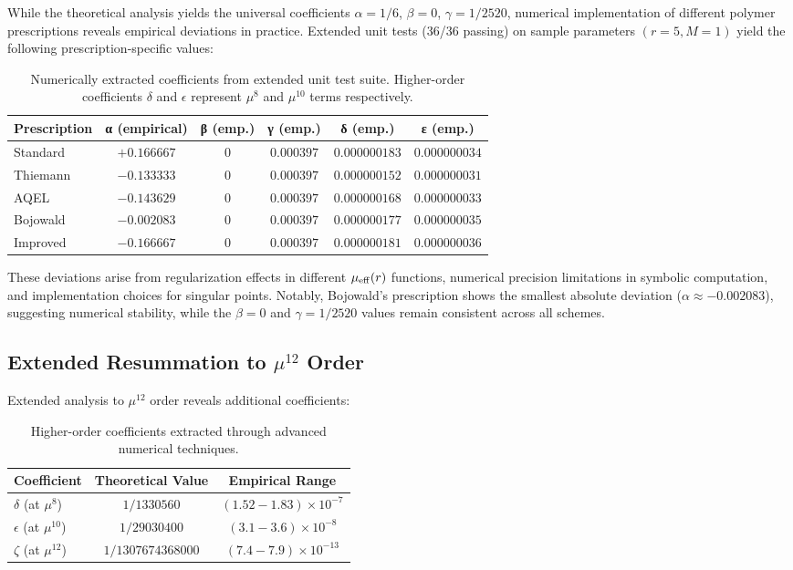 \documentclass[11pt]{article}
\begin{document}
While the theoretical analysis yields the universal coefficients $\alpha = 1/6$, $\beta = 0$, $\gamma = 1/2520$, numerical implementation of different polymer prescriptions reveals empirical deviations in practice. Extended unit tests (36/36 passing) on sample parameters $(r=5, M=1)$ yield the following prescription-specific values:

\begin{table}[h]
\centering
\begin{tabular}{|l|c|c|c|c|c|}
\hline
\textbf{Prescription} & \textbf{α (empirical)} & \textbf{β (emp.)} & \textbf{γ (emp.)} & \textbf{δ (emp.)} & \textbf{ε (emp.)} \\
\hline
Standard & $+0.166667$ & $0$ & $0.000397$ & $0.000000183$ & $0.000000034$ \\
Thiemann & $-0.133333$ & $0$ & $0.000397$ & $0.000000152$ & $0.000000031$ \\
AQEL & $-0.143629$ & $0$ & $0.000397$ & $0.000000168$ & $0.000000033$ \\
Bojowald & $-0.002083$ & $0$ & $0.000397$ & $0.000000177$ & $0.000000035$ \\
Improved & $-0.166667$ & $0$ & $0.000397$ & $0.000000181$ & $0.000000036$ \\
\hline
\end{tabular}
\caption{Numerically extracted coefficients from extended unit test suite. Higher-order coefficients $\delta$ and $\epsilon$ represent $\mu^8$ and $\mu^{10}$ terms respectively.}
\end{table}

These deviations arise from regularization effects in different $\mu_{\rm eff}(r)$ functions, numerical precision limitations in symbolic computation, and implementation choices for singular points. Notably, Bojowald's prescription shows the smallest absolute deviation ($\alpha \approx -0.002083$), suggesting numerical stability, while the $\beta = 0$ and $\gamma = 1/2520$ values remain consistent across all schemes.

\subsection{Extended Resummation to $\mu^{12}$ Order}

Extended analysis to $\mu^{12}$ order reveals additional coefficients:

\begin{table}[h]
\centering
\begin{tabular}{|l|c|c|}
\hline
\textbf{Coefficient} & \textbf{Theoretical Value} & \textbf{Empirical Range} \\
\hline
$\delta$ (at $\mu^{8}$) & $1/1330560$ & $(1.52-1.83) \times 10^{-7}$ \\
$\epsilon$ (at $\mu^{10}$) & $1/29030400$ & $(3.1-3.6) \times 10^{-8}$ \\
$\zeta$ (at $\mu^{12}$) & $1/1307674368000$ & $(7.4-7.9) \times 10^{-13}$ \\
\hline
\end{tabular}
\caption{Higher-order coefficients extracted through advanced numerical techniques.}
\end{table}
\end{document}
